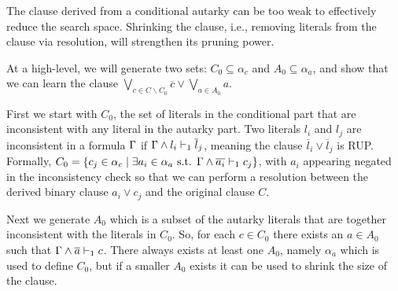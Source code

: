 The \pr clause derived from a conditional autarky can be too weak to effectively
reduce the search space.
Shrinking the \pr clause, i.e., removing literals from the clause via
resolution, will strengthen its pruning power. 

At a high-level, we will generate two sets: $C_0 \subseteq \alpha_c$ and $A_0
\subseteq \alpha_a$, and show that we can learn the \pr clause $\bigvee_{c \in C
\backslash C_0} \overline{c} \lor \bigvee_{a \in A_0} a$. 

First we start with $C_0$, the set of literals in the conditional part that are
inconsistent with any literal in the autarky part. Two literals $l_i$ and $l_j$
are inconsistent in a formula $\Gamma$ if
$\Gamma \land l_i \vdash_1 \overline{l}_j$, meaning the clause
$\overline{l}_i \lor \overline{l}_j$ is RUP. Formally, $C_0 = \{c_j \in \alpha_c
\mid \exists a_i \in \alpha_a \text{ s.t. }
\Gamma \land \overline{a_i} \vdash_1 c_j \}$, with $a_i$ appearing negated
in the inconsistency check so that we can perform a resolution between the
derived binary clause  $a_i \lor c_j$ and the original \pr clause $C$.

Next we generate $A_0$ which is a subset of the autarky literals that are
together inconsistent with the literals in $C_0$. So, for each $c \in C_0$ there
exists an $a \in A_0$ such that $\Gamma \land \overline{a} \vdash_1 c$. There always
exists at least one $A_0$, namely $\alpha_a$ which is used to define $C_0$, but
if a smaller $A_0$ exists it can be used to shrink the size of the \pr clause. 


